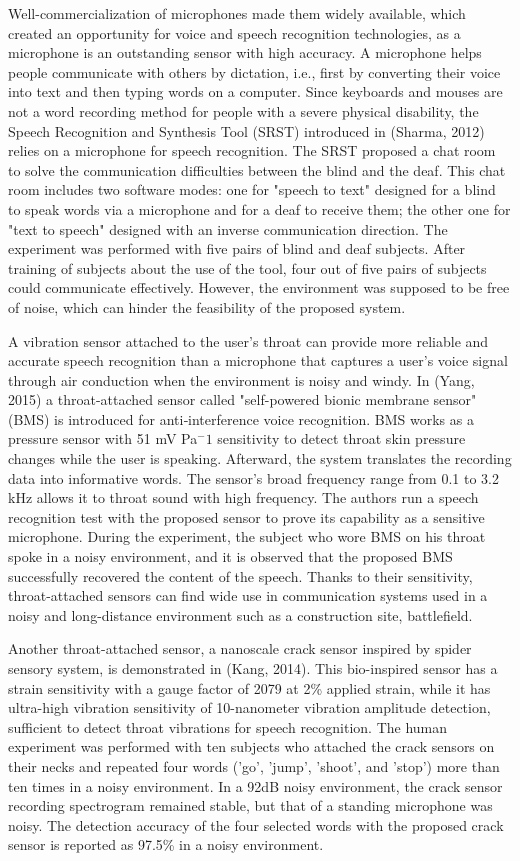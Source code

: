 Well-commercialization of microphones made them widely available, which created an opportunity for voice and speech recognition technologies, as a microphone is an outstanding sensor with high accuracy. A microphone helps people communicate with others by dictation, i.e., first by converting their voice into text and then typing words on a computer. Since keyboards and mouses are not a word recording method for people with a severe physical disability, the Speech Recognition and Synthesis Tool (SRST) introduced in (Sharma, 2012) relies on a microphone for speech recognition. The SRST proposed a chat room to solve the communication difficulties between the blind and the deaf. This chat room includes two software modes: one for "speech to text" designed for a blind to speak words via a microphone and for a deaf to receive them; the other one for "text to speech" designed with an inverse communication direction. The experiment was performed with five pairs of blind and deaf subjects. After training of subjects about the use of the tool, four out of five pairs of subjects could communicate effectively. However, the environment was supposed to be free of noise, which can hinder the feasibility of the proposed system.

A vibration sensor attached to the user's throat can provide more reliable and accurate speech recognition than a microphone that captures a user's voice signal through air conduction when the environment is noisy and windy. In (Yang, 2015) a throat-attached sensor called "self-powered bionic membrane sensor" (BMS) is introduced for anti‐interference voice recognition. BMS works as a pressure sensor with 51 mV Pa$^-1$ sensitivity to detect throat skin pressure changes while the user is speaking. Afterward, the system translates the recording data into informative words. The sensor's broad frequency range from 0.1 to 3.2 kHz allows it to throat sound with high frequency. The authors run a speech recognition test with the proposed sensor to prove its capability as a sensitive microphone. During the experiment, the subject who wore BMS on his throat spoke in a noisy environment, and it is observed that the proposed BMS successfully recovered the content of the speech. Thanks to their sensitivity, throat-attached sensors can find wide use in communication systems used in a noisy and long-distance environment such as a construction site, battlefield. 

Another throat-attached sensor, a nanoscale crack sensor inspired by spider sensory system, is demonstrated in (Kang, 2014). This bio-inspired sensor has a strain sensitivity with a gauge factor of 2079 at 2\% applied strain, while it has ultra-high vibration sensitivity of 10-nanometer vibration amplitude detection, sufficient to detect throat vibrations for speech recognition. The human experiment was performed with ten subjects who attached the crack sensors on their necks and repeated four words ('go', 'jump', 'shoot', and 'stop') more than ten times in a noisy environment. In a 92dB noisy environment, the crack sensor recording spectrogram remained stable, but that of a standing microphone was noisy. The detection accuracy of the four selected words with the proposed crack sensor is reported as 97.5\% in a noisy environment.

